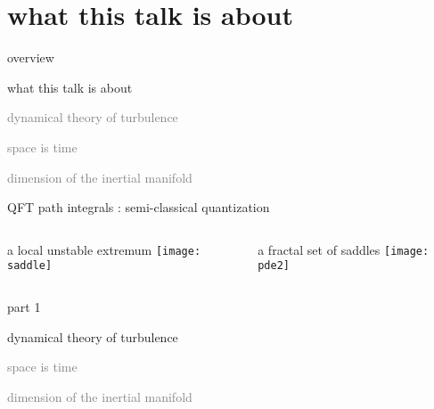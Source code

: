 \section[what this talk is about]
 {what this talk is about}

\begin{frame}{overview}
\begin{enumerate}
              \item {\Large
what this talk is about
                  }\textcolor{gray}{\small
              \item
dynamical theory of turbulence
              \item
\statesp
              \item
space is time
              \item
dimension of the inertial manifold
                    }
            \end{enumerate}
\end{frame}

\begin{frame}{QFT path integrals : semi-classical quantization}
  \begin{columns}
\begin{block}{a local unstable extremum}
\texttt{[image: saddle]}%
\end{block}
\begin{block}{a fractal set of saddles}
\texttt{[image: pde2]}%
\end{block}
  \end{columns}
\end{frame}


\begin{frame}{part 1}
\begin{enumerate}
              \item {\Large
dynamical theory of turbulence
                  }\textcolor{gray}{\small
              \item
\statesp
              \item
space is time
             \item
dimension of the inertial manifold
                    }
            \end{enumerate}
\end{frame}


